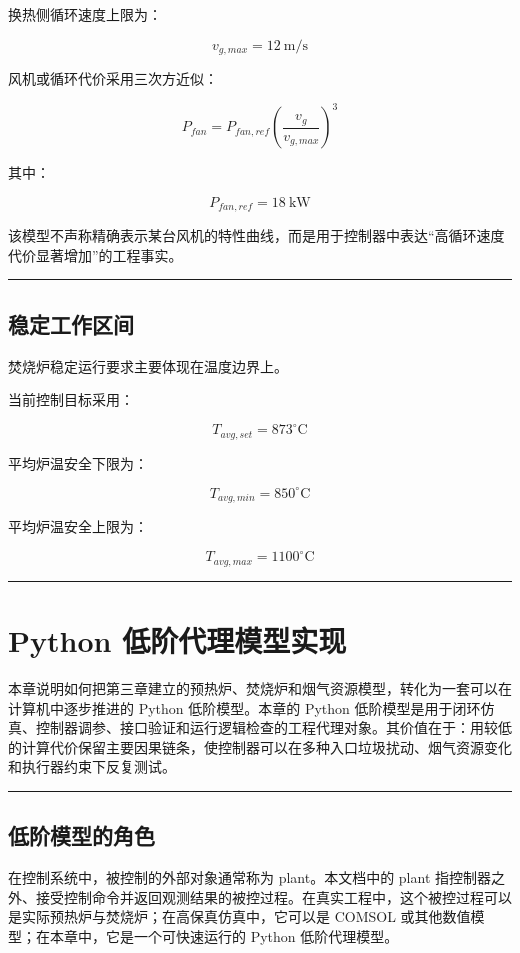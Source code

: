 \documentclass[UTF8,openany,zihao=-4,oneside]{ctexbook}
\newcommand{\manualdivider}{\par\vspace{0.6em}\noindent\textcolor{FGLine}{\rule{\linewidth}{0.7pt}}\vspace{0.6em}\par}
\begin{document}
换热侧循环速度上限为：

\[
v_{g,max}=12\ \mathrm{m/s}
\]

风机或循环代价采用三次方近似：

\[
P_{fan}=P_{fan,ref}\left(\frac{v_g}{v_{g,max}}\right)^3
\]

其中：

\[
P_{fan,ref}=18\ \mathrm{kW}
\]

该模型不声称精确表示某台风机的特性曲线，而是用于控制器中表达``高循环速度代价显著增加''的工程事实。

\manualdivider

\section{稳定工作区间}\label{ux7a33ux5b9aux5de5ux4f5cux533aux95f4}

焚烧炉稳定运行要求主要体现在温度边界上。

当前控制目标采用：

\[
T_{avg,set}=873^\circ\mathrm{C}
\]

平均炉温安全下限为：

\[
T_{avg,min}=850^\circ\mathrm{C}
\]

平均炉温安全上限为：

\[
T_{avg,max}=1100^\circ\mathrm{C}
\]

\manualdivider

\chapter{Python 低阶代理模型实现}\label{python-ux4f4eux9636ux6a21ux578bux5b9eux73b0}

本章说明如何把第三章建立的预热炉、焚烧炉和烟气资源模型，转化为一套可以在计算机中逐步推进的 Python 低阶模型。本章的 Python 低阶模型是用于闭环仿真、控制器调参、接口验证和运行逻辑检查的工程代理对象。其价值在于：用较低的计算代价保留主要因果链条，使控制器可以在多种入口垃圾扰动、烟气资源变化和执行器约束下反复测试。

\manualdivider

\section{低阶模型的角色}\label{ux4f4eux9636ux6a21ux578bux5728ux9879ux76eeux4e2dux7684ux89d2ux8272}

在控制系统中，被控制的外部对象通常称为 plant。本文档中的 plant 指控制器之外、接受控制命令并返回观测结果的被控过程。在真实工程中，这个被控过程可以是实际预热炉与焚烧炉；在高保真仿真中，它可以是 COMSOL 或其他数值模型；在本章中，它是一个可快速运行的 Python 低阶代理模型。
\end{document}
